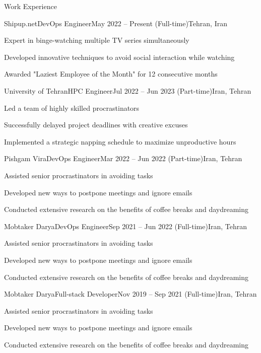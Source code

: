 \documentclass[]{main}
\begin{document}
\begin{section}{Work Experience}
 \begin{subsection}{Shipup.net}{DevOps Engineer}{May 2022 -- Present (Full-time)}{Tehran, Iran}
     \item Expert in binge-watching multiple TV series simultaneously
     \item Developed innovative techniques to avoid social interaction while watching
     \item Awarded "Laziest Employee of the Month" for 12 consecutive months
 \end{subsection}

 \begin{subsection}{University of Tehran}{HPC Engineer}{Jul 2022 -- Jun 2023 (Part-time)}{Iran, Tehran}
     \item Led a team of highly skilled procrastinators
     \item Successfully delayed project deadlines with creative excuses
     \item Implemented a strategic napping schedule to maximize unproductive hours
 \end{subsection}

 \begin{subsection}{Pishgam Vira}{DevOps Engineer}{Mar 2022 -- Jun 2022 (Part-time)}{Iran, Tehran}
     \item Assisted senior procrastinators in avoiding tasks
     \item Developed new ways to postpone meetings and ignore emails
     \item Conducted extensive research on the benefits of coffee breaks and daydreaming
 \end{subsection}

 \begin{subsection}{Mobtaker Darya}{DevOps Engineer}{Sep 2021 -- Jun 2022 (Full-time)}{Iran, Tehran}
     \item Assisted senior procrastinators in avoiding tasks
     \item Developed new ways to postpone meetings and ignore emails
     \item Conducted extensive research on the benefits of coffee breaks and daydreaming
 \end{subsection}

 \begin{subsection}{Mobtaker Darya}{Full-stack Developer}{Nov 2019 -- Sep 2021 (Full-time)}{Iran, Tehran}
     \item Assisted senior procrastinators in avoiding tasks
     \item Developed new ways to postpone meetings and ignore emails
     \item Conducted extensive research on the benefits of coffee breaks and daydreaming
 \end{subsection}


\end{section}
\end{document}

